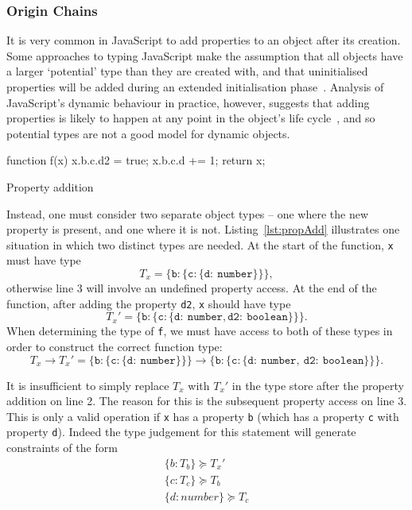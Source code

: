\documentclass[12pt,a4paper,twoside,openright]{report}
\theoremstyle{definition}
\theoremstyle{dotless}
\newcommand*{\js}{\texttt}
\begin{document}
\subsubsection*{Origin Chains}

It is very common in JavaScript to add properties to an object
after its creation. Some approaches to typing JavaScript make the assumption
that all objects have a larger `potential' type than they are created with, and
that uninitialised properties will be added during an extended initialisation
phase~\cite{anderson05}. Analysis of JavaScript's dynamic behaviour in
practice, however, suggests that adding properties is likely to happen at any
point in the object's life cycle~\cite{JSBehaviour}, and so potential types are
not a good model for dynamic objects.

\begin{listing}[t]
  \centering
  \begin{minipage}[b]{0.45\linewidth}
 	\begin{jscript}
	  function f(x) {
	 	x.b.c.d2 = true;
	 	x.b.c.d += 1;
	 	return x;
	  }	
 	\end{jscript}
 	\vspace{23mm}
  \end{minipage}
  \quad
  \begin{minipage}[b]{0.45\linewidth}
  \end{minipage}
  \caption{Property addition}\label{lst:propAdd}
\end{listing}
Instead, one must consider two separate object types -- one where the new
property is present, and one where it is not. Listing~\ref{lst:propAdd}
illustrates one situation in which two distinct types are needed. At the start
of the function, \js{x} must have type 
$$T_x = \mathtt{\{b:\{c:\{d:\ number\}\}\}},$$
otherwise line 3 will involve an undefined property access. At the end of the
function, after adding the property \js{d2}, \js{x} should have type 
$$T_x' = \mathtt{\{b:\{c:\{d:\ number, d2:\ boolean\}\}\}}.$$
When determining the type
of \js{f}, we must have access to both of these types in order to construct the
correct function type: 
$$
T_x \rightarrow T_x' =
\mathtt{\{b:\{c:\{d:\ number\}\}\} \rightarrow
  \{b:\{c:\{d:\ number,\ d2:\ boolean\}\}\}}.
$$

It is insufficient to simply replace $T_x$
with $T_x'$ in the type store after the property addition on line 2.  The reason for this
is the subsequent property access on line 3. This is only a valid operation if \js{x} has
a property \js{b} (which has a property \js{c} with property \js{d}). Indeed the
type judgement for this statement will generate constraints of the form 
\begin{equation}
  \begin{split}
 	\label{eq:barC}
 	\{b:T_b\} \succeq T_x' \\
 	\{c:T_c\} \succeq T_b \\
 	\{d:number\} \succeq T_c \\
  \end{split}
\end{equation}
\end{document}
